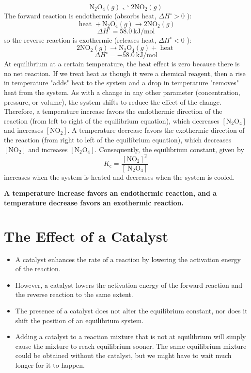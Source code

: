 \documentclass[a4paper,12pt,twocolumn]{article}
\begin{document}
$$
\mathrm{N}_2 \mathrm{O}_4(g) \rightleftharpoons 2 \mathrm{NO}_2(g)
$$
The forward reaction is endothermic (absorbs heat, $\Delta H^{\circ}>0$ ):
$$
\text { heat }+\mathrm{N}_2 \mathrm{O}_4(g) \longrightarrow 2 \mathrm{NO}_2(g)$$ 
$$\Delta H^{\circ}=58.0 \mathrm{~kJ} / \mathrm{mol}
$$
so the reverse reaction is exothermic (releases heat, $\Delta H^{\circ}<0$ ):
$$
2 \mathrm{NO}_2(g) \longrightarrow \mathrm{N}_2 \mathrm{O}_4(g)+\text { heat }$$  
$$\Delta H^{\circ}=-58.0 \mathrm{~kJ} / \mathrm{mol}
$$
At equilibrium at a certain temperature, the heat effect is zero because there is no net reaction. If we treat heat as though it were a chemical reagent, then a rise in temperature "adds" heat to the system and a drop in temperature "removes" heat from the system. As with a change in any other parameter (concentration, pressure, or volume), the system shifts to reduce the effect of the change. Therefore, a temperature increase favors the endothermic direction of the reaction (from left to right of the equilibrium equation), which decreases $\left[\mathrm{N}_2 \mathrm{O}_4\right]$ and increases $\left[\mathrm{NO}_2\right]$. A temperature decrease favors the exothermic direction of the reaction (from right to left of the equilibrium equation), which decreases $\left[\mathrm{NO}_2\right]$ and increases $\left[\mathrm{N}_2 \mathrm{O}_4\right]$. Consequently, the equilibrium constant, given by
$$
K_{\mathrm{c}}=\frac{\left[\mathrm{NO}_2\right]^2}{\left[\mathrm{~N}_2 \mathrm{O}_4\right]}
$$
increases when the system is heated and decreases when the system is cooled.


\begin{Box1}{}
    {\large     \textbf{A temperature increase favors an endothermic reaction, and a temperature decrease favors an exothermic reaction.}}
\end{Box1}

\section{The Effect of a Catalyst}
\begin{itemize}
    \item A catalyst enhances the rate of a reaction by lowering the activation energy of the reaction. 
    \item However, a catalyst lowers the activation energy of the forward reaction and the reverse reaction to the same extent.
    \item The presence of a catalyst does not alter the equilibrium constant, nor does it shift the position of an equilibrium system. 
    \item Adding a catalyst to a reaction mixture that is not at equilibrium will simply cause the mixture to reach equilibrium sooner. The same equilibrium mixture could be obtained without the catalyst, but we might have to wait much longer for it to happen.
\end{itemize}
\end{document}
